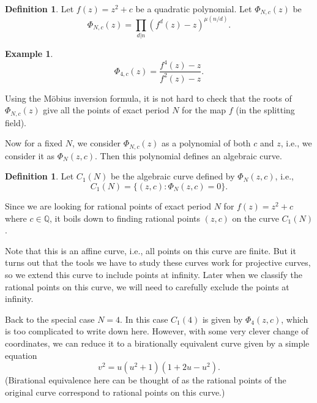 \documentclass{amsart}
\theoremstyle{plain}
\theoremstyle{definition}
\newtheorem{definition}[theorem]{Definition}
\newtheorem{example}[theorem]{Example}
\theoremstyle{remark}
\newcommand{\Q}{\mathbb{Q}}
\begin{document}
\begin{definition}
  Let $f(z) = z^2 + c$ be a quadratic polynomial. Let $\Phi_{N, c}(z)$
  be
  \[
  \Phi_{N,c}(z) = \prod_{d|n}(f^d(z) - z)^{\mu(n/d)}.
  \]
\end{definition}

\begin{example}
  \[
  \Phi_{4, c}(z) = \frac{f^4(z) - z}{f^2(z) - z}.
  \]
\end{example}

Using the M\"obius inversion formula, it is not hard to check that the
roots of $\Phi_{N, c}(z)$ give all the points of exact period $N$ for
the map $f$ (in the splitting field).

Now for a fixed $N$, we consider $\Phi_{N, c}(z)$ as a polynomial of
both $c$ and $z$, i.e., we consider it as $\Phi_N(z, c)$. Then this
polynomial defines an algebraic curve.

\begin{definition}
  Let $C_1(N)$ be the algebraic curve defined by $\Phi_N(z, c)$, i.e.,
  \[
  C_1(N) = \{(z, c) : \Phi_N(z, c) = 0\}.
  \]
\end{definition}

Since we are looking for rational points of exact period $N$ for $f(z)
= z^2 + c$ where $c \in \Q$, it boils down to finding rational points
$(z, c)$ on the curve $C_1(N)$.

Note that this is an affine curve, i.e., all points on this curve are
finite. But it turns out that the tools we have to study these curves
work for projective curves, so we extend this curve to include points
at infinity. Later when we classify the rational points on this curve,
we will need to carefully exclude the points at infinity.

%

Back to the special case $N = 4$. In this case $C_1(4)$ is given by
$\Phi_4(z, c)$, which is too complicated to write down here. However,
with some very clever change of coordinates, we can reduce it to a
birationally equivalent curve given by a simple equation
\[
v^2 = u(u^2 + 1)(1 + 2u - u^2).
\]
(Birational equivalence here can be thought of as the rational points
of the original curve correspond to rational points on this curve.)
\end{document}
